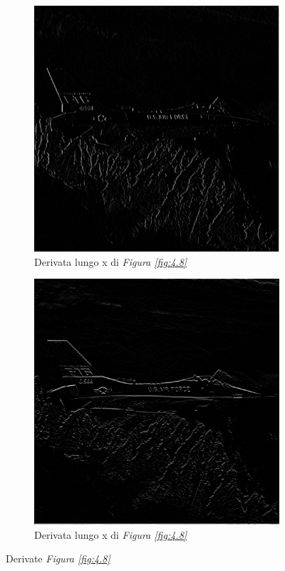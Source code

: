 \documentclass{subfiles}
\begin{document}
\begin{figure}[!h]
    \centering
    \begin{subfigure}[b]{0.4\textwidth}
        \centering
        \includegraphics[scale = 0.3]{../Images/Airplane/DeXAirplane.png}
        \caption{Derivata lungo x di \emph{Figura \ref{fig:4.8}}}
    \end{subfigure}
    \hspace{10pt}
    \begin{subfigure}[b]{0.4\textwidth}
        \centering
        \includegraphics[scale = 0.3]{../Images/Airplane/DeYAirplane.png}
        \caption{Derivata lungo x di \emph{Figura \ref{fig:4.8}}}
    \end{subfigure}
    \caption{Derivate \emph{Figura \ref{fig:4.8}}}
    \label{fig:4.9}
\end{figure}
\end{document}
